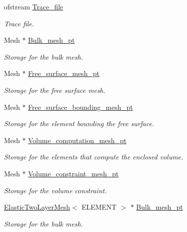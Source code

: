 \begin{DoxyCompactItemize}
\item 
ofstream \hyperlink{classPseudoSolidCapProblem_a81d2d9915ba7d9a9a691ca2f2080b6b4}{Trace\+\_\+file}
\begin{DoxyCompactList}\small\item\em Trace file. \end{DoxyCompactList}\item 
Mesh $\ast$ \hyperlink{classPseudoSolidCapProblem_a6d4520b30d05f3dde12ea9bae9d62d0b}{Bulk\+\_\+mesh\+\_\+pt}
\begin{DoxyCompactList}\small\item\em Storage for the bulk mesh. \end{DoxyCompactList}\item 
Mesh $\ast$ \hyperlink{classPseudoSolidCapProblem_ac1de72bb2e35d6fbd76ef0ea6c19dc48}{Free\+\_\+surface\+\_\+mesh\+\_\+pt}
\begin{DoxyCompactList}\small\item\em Storage for the free surface mesh. \end{DoxyCompactList}\item 
Mesh $\ast$ \hyperlink{classPseudoSolidCapProblem_ab0e178700d6f9d2b6a86ae58483d6e2e}{Free\+\_\+surface\+\_\+bounding\+\_\+mesh\+\_\+pt}
\begin{DoxyCompactList}\small\item\em Storage for the element bounding the free surface. \end{DoxyCompactList}\item 
Mesh $\ast$ \hyperlink{classPseudoSolidCapProblem_a173d08853c11d0692a4e922bc3fcf53f}{Volume\+\_\+computation\+\_\+mesh\+\_\+pt}
\begin{DoxyCompactList}\small\item\em Storage for the elements that compute the enclosed volume. \end{DoxyCompactList}\item 
Mesh $\ast$ \hyperlink{classPseudoSolidCapProblem_a65b3318c82437c510f23ee0ae898ff6c}{Volume\+\_\+constraint\+\_\+mesh\+\_\+pt}
\begin{DoxyCompactList}\small\item\em Storage for the volume constraint. \end{DoxyCompactList}\item 
\hyperlink{classElasticTwoLayerMesh}{Elastic\+Two\+Layer\+Mesh}$<$ E\+L\+E\+M\+E\+NT $>$ $\ast$ \hyperlink{classPseudoSolidCapProblem_a24ee2e5afd19ab0febf85306d45c8385}{Bulk\+\_\+mesh\+\_\+pt}
\begin{DoxyCompactList}\small\item\em Storage for the bulk mesh. \end{DoxyCompactList}\end{DoxyCompactItemize}


